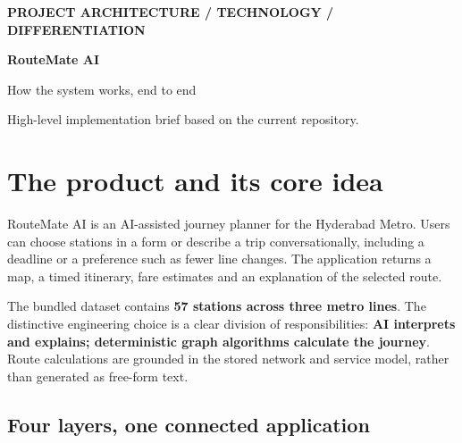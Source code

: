 \documentclass[10pt,a4paper]{article}
\begin{document}
{\small\bfseries\color{teal}PROJECT ARCHITECTURE \quad / \quad TECHNOLOGY \quad / \quad DIFFERENTIATION}
\vspace{0.5em}

{\Huge\bfseries\color{navy}RouteMate AI}\par
{\LARGE\color{navy}How the system works, end to end}\par
{\color{muted}High-level implementation brief based on the current repository.}

\section{The product and its core idea}
RouteMate AI is an AI-assisted journey planner for the Hyderabad Metro. Users can choose stations in a form or describe a trip conversationally, including a deadline or a preference such as fewer line changes. The application returns a map, a timed itinerary, fare estimates and an explanation of the selected route.

The bundled dataset contains \textbf{57 stations across three metro lines}. The distinctive engineering choice is a clear division of responsibilities: \textbf{AI interprets and explains; deterministic graph algorithms calculate the journey}. Route calculations are grounded in the stored network and service model, rather than generated as free-form text.

\subsection{Four layers, one connected application}
\begin{center}
\end{center}
\end{document}
